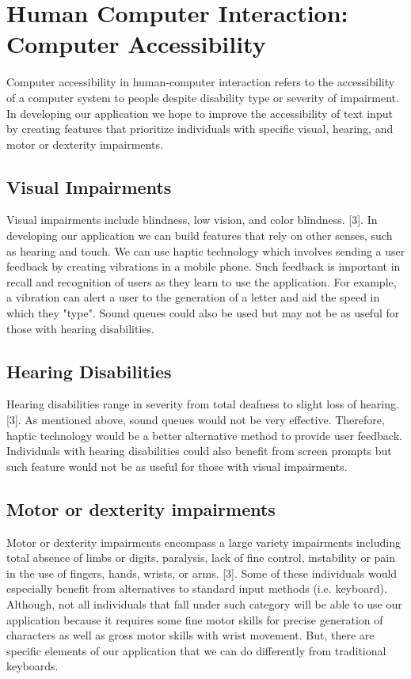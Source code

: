 \documentclass[onecolumn, draftclsnofoot,10pt, journal, letterpaper]{IEEEtran}
\begin{document}
\section{Human Computer Interaction: Computer Accessibility}
Computer accessibility in human-computer interaction refers to the accessibility of a computer system to people despite disability type or severity of impairment. In developing our application we hope to improve the accessibility of text input by creating features that prioritize individuals with specific visual, hearing, and motor or dexterity impairments.
\subsection{Visual Impairments}
Visual impairments include blindness, low vision, and color blindness. [3]. In developing our application we can build features that rely on other senses, such as hearing and touch. We can use haptic technology which involves sending a user feedback by creating vibrations in a mobile phone. Such feedback is important in recall and recognition of users as they learn to use the application. For example, a vibration can alert a user to the generation of a letter and aid the speed in which they "type". Sound queues could also be used but may not be as useful for those with hearing disabilities. 
\subsection{Hearing Disabilities}
Hearing disabilities range in severity from total deafness to slight loss of hearing. [3]. As mentioned above, sound queues would not be very effective. Therefore, haptic technology would be a better alternative method to provide user feedback. Individuals with hearing disabilities could also benefit from screen prompts but such feature would not be as useful for those with visual impairments. 
\subsection{Motor or dexterity impairments}
Motor or dexterity impairments encompass a large variety impairments including total absence of limbs or digits, paralysis, lack of fine control, instability or pain in the use of fingers, hands, wrists, or arms. [3]. Some of these individuals would especially benefit from alternatives to standard input methods (i.e. keyboard). Although, not all individuals that fall under such category will be able to use our application because it requires some fine motor skills for precise generation of characters as well as gross motor skills with wrist movement. But, there are specific elements of our application that we can do differently from traditional keyboards. 
\end{document}
